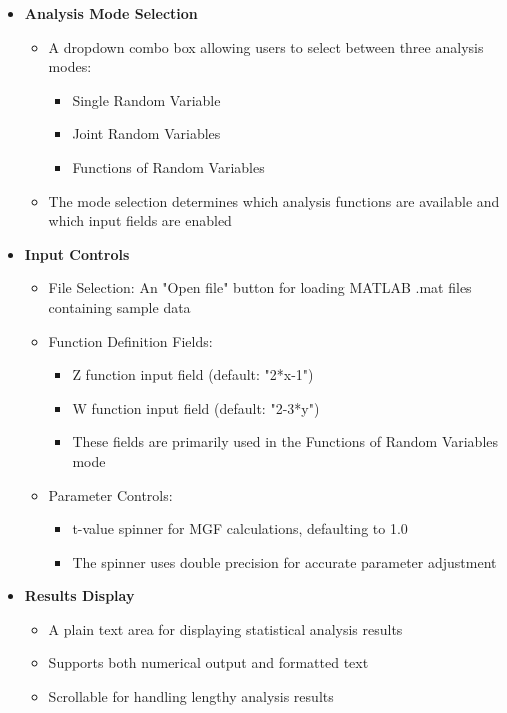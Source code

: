 \documentclass{article}
\begin{document}
\begin{itemize}
    \item \textbf{Analysis Mode Selection}
    \begin{itemize}
        \item A dropdown combo box allowing users to select between three analysis modes:
        \begin{itemize}
            \item Single Random Variable
            \item Joint Random Variables
            \item Functions of Random Variables
        \end{itemize}
        \item The mode selection determines which analysis functions are available and which input fields are enabled
    \end{itemize}
    
    \item \textbf{Input Controls}
    \begin{itemize}
        \item File Selection: An "Open file" button for loading MATLAB .mat files containing sample data
        \item Function Definition Fields:
        \begin{itemize}
            \item Z function input field (default: "2*x-1")
            \item W function input field (default: "2-3*y")
            \item These fields are primarily used in the Functions of Random Variables mode
        \end{itemize}
        \item Parameter Controls:
        \begin{itemize}
            \item t-value spinner for MGF calculations, defaulting to 1.0
            \item The spinner uses double precision for accurate parameter adjustment
        \end{itemize}
    \end{itemize}
    
    \item \textbf{Results Display}
    \begin{itemize}
        \item A plain text area for displaying statistical analysis results
        \item Supports both numerical output and formatted text
        \item Scrollable for handling lengthy analysis results
    \end{itemize}
\end{itemize}
\end{document}
